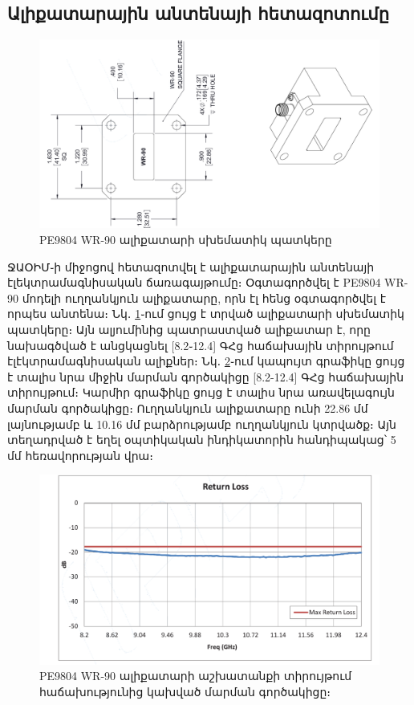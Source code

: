 \documentclass[12pt, fleqn]{report}
\begin{document}
\subsection{Ալիքատարային անտենայի հետազոտումը}
\begin{figure}
    \centering
    \includegraphics[width=1.0\textwidth]{data/waveguide/waveguide-scheme.png}
    \caption{PE9804 WR-90 ալիքատարի սխեմատիկ պատկերը}
    \label{fig:waveguide-scheme}
\end{figure}
ՋԱՕԻՄ֊ի միջոցով հետազոտվել է ալիքատարային անտենայի էլեկտրամագնիսական ճառագայթումը։ Օգտագործվել է PE9804 WR-90 մոդելի ուղղանկյուն ալիքատարը, որն էլ հենց օգտագործվել է որպես անտենա։ Նկ․ \ref{fig:waveguide-scheme}֊ում ցույց է տրված ալիքատարի սխեմատիկ պատկերը։ Այն ալյումինից պատրաստված ալիքատար է, որը նախագծված է անցկացնել [8.2֊12.4] ԳՀց հաճախային տիրույթում էլէկտրամագնիսական ալիքներ։ Նկ․ \ref{fig:waveguide-return-loss}֊ում կապույտ գրաֆիկը ցույց է տալիս նրա միջին մարման գործակիցը [8.2-12.4] ԳՀց հաճախային տիրույթում։ Կարմիր գրաֆիկը ցույց է տալիս նրա առավելագույն մարման գործակիցը։ Ուղղանկյուն ալիքատարը ունի 22.86 մմ լայնությամբ և 10.16 մմ բարձրությամբ ուղղանկյուն կտրվածք։ Այն տեղադրված է եղել օպտիկական ինդիկատորին հանդիպակաց՝ 5 մմ հեռավորության վրա։
\begin{figure}
    \centering
    \includegraphics[width=1.0\textwidth]{data/waveguide/return-loss.png}
    \caption{PE9804 WR-90 ալիքատարի աշխատանքի տիրույթում հաճախությունից կախված մարման գործակիցը։}
    \label{fig:waveguide-return-loss}
\end{figure}
\end{document}

